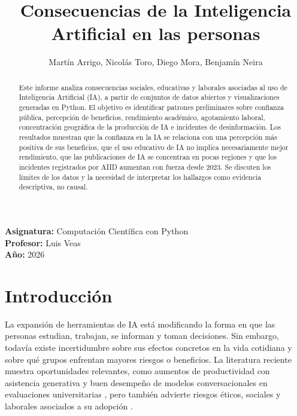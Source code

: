 \documentclass{llncs}
\begin{document}
\title{Consecuencias de la Inteligencia Artificial en las personas}
\author{Martín Arrigo, Nicolás Toro, Diego Mora, Benjamín Neira}

\maketitle
\pagestyle{empty}

\begin{center}
\textbf{Asignatura:} Computación Científica con Python\\
\textbf{Profesor:} Luis Veas\\
\textbf{Año:} 2026
\end{center}

\begin{abstract}
Este informe analiza consecuencias sociales, educativas y laborales asociadas al uso de Inteligencia Artificial (IA), a partir de conjuntos de datos abiertos y visualizaciones generadas en Python. El objetivo es identificar patrones preliminares sobre confianza pública, percepción de beneficios, rendimiento académico, agotamiento laboral, concentración geográfica de la producción de IA e incidentes de desinformación. Los resultados muestran que la confianza en la IA se relaciona con una percepción más positiva de sus beneficios, que el uso educativo de IA no implica necesariamente mejor rendimiento, que las publicaciones de IA se concentran en pocas regiones y que los incidentes registrados por AIID aumentan con fuerza desde 2023. Se discuten los límites de los datos y la necesidad de interpretar los hallazgos como evidencia descriptiva, no causal.
\end{abstract}


\section{Introducción}
La expansión de herramientas de IA está modificando la forma en que las personas estudian, trabajan, se informan y toman decisiones. Sin embargo, todavía existe incertidumbre sobre sus efectos concretos en la vida cotidiana y sobre qué grupos enfrentan mayores riesgos o beneficios. La literatura reciente muestra oportunidades relevantes, como aumentos de productividad con asistencia generativa \cite{brynjolfsson2023} y buen desempeño de modelos conversacionales en evaluaciones universitarias \cite{geerling2023}, pero también advierte riesgos éticos, sociales y laborales asociados a su adopción \cite{weidinger2021,eloundou2023,wef2023}.
\end{document}
